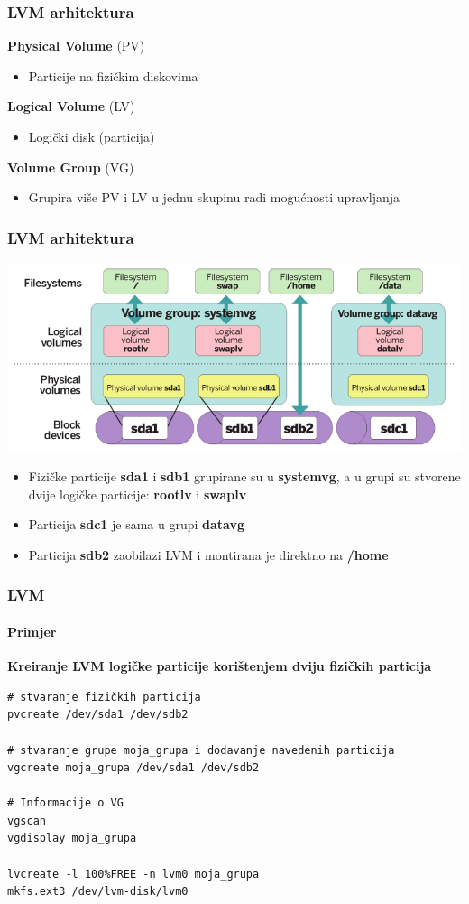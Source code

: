 \documentclass[t]{beamer}
\begin{document}
\begin{frame}
	\frametitle{LVM arhitektura}
	\textbf{Physical Volume} (PV)
	\begin{itemize}
		\item Particije na fizičkim diskovima
	\end{itemize}
	\vfill
	\textbf{Logical Volume} (LV)
	\begin{itemize}
		\item Logički disk (particija)
	\end{itemize}
	\vfill
	\textbf{Volume Group} (VG)
	\begin{itemize}
		\item Grupira više PV i LV u jednu skupinu radi mogućnosti upravljanja
	\end{itemize}
	\textbf{}
\end{frame}

\begin{frame}
	\frametitle{LVM arhitektura}
	\includegraphics[width=\textwidth]{lvm_arch.png}
	\vfill
	\begin{itemize}
		\item Fizičke particije \textbf{sda1} i \textbf{sdb1} grupirane su u \textbf{systemvg}, a u grupi su stvorene dvije logičke particije: \textbf{rootlv} i \textbf{swaplv}
		\item Particija \textbf{sdc1} je sama u grupi \textbf{datavg}
		\item Particija \textbf{sdb2} zaobilazi LVM i montirana je direktno na \textbf{/home}
	\end{itemize}
\end{frame}

\begin{frame}[fragile]
	\frametitle{LVM}
	\framesubtitle{Primjer}
	\textbf{Kreiranje LVM logičke particije korištenjem dviju fizičkih particija}\\
	\begin{verbatim}
# stvaranje fizičkih particija
pvcreate /dev/sda1 /dev/sdb2 

# stvaranje grupe moja_grupa i dodavanje navedenih particija
vgcreate moja_grupa /dev/sda1 /dev/sdb2 

# Informacije o VG
vgscan
vgdisplay moja_grupa

lvcreate -l 100%FREE -n lvm0 moja_grupa
mkfs.ext3 /dev/lvm-disk/lvm0
	\end{verbatim}
\end{frame}
\end{document}
